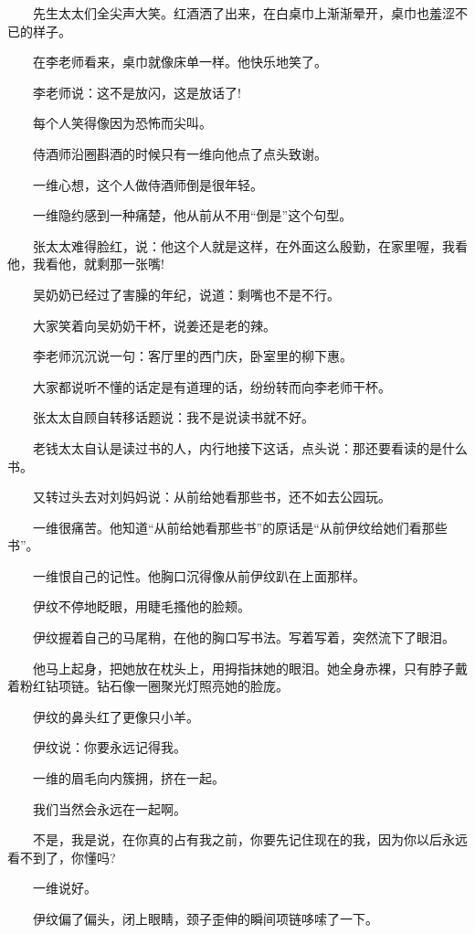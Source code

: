 \documentclass[12pt,UTF8]{ctexbook}
\begin{document}
　　先生太太们全尖声大笑。红酒洒了出来，在白桌巾上渐渐晕开，桌巾也羞涩不已的样子。

　　在李老师看来，桌巾就像床单一样。他快乐地笑了。

　　李老师说：这不是放闪，这是放话了!

　　每个人笑得像因为恐怖而尖叫。

　　侍酒师沿圈斟酒的时候只有一维向他点了点头致谢。

　　一维心想，这个人做侍酒师倒是很年轻。

　　一维隐约感到一种痛楚，他从前从不用\enquote{倒是}这个句型。

　　张太太难得脸红，说：他这个人就是这样，在外面这么殷勤，在家里喔，我看他，我看他，就剩那一张嘴!

　　吴奶奶已经过了害臊的年纪，说道：剩嘴也不是不行。

　　大家笑着向吴奶奶干杯，说姜还是老的辣。

　　李老师沉沉说一句：客厅里的西门庆，卧室里的柳下惠。

　　大家都说听不懂的话定是有道理的话，纷纷转而向李老师干杯。

　　张太太自顾自转移话题说：我不是说读书就不好。

　　老钱太太自认是读过书的人，内行地接下这话，点头说：那还要看读的是什么书。

　　又转过头去对刘妈妈说：从前给她看那些书，还不如去公园玩。

　　一维很痛苦。他知道\enquote{从前给她看那些书}的原话是\enquote{从前伊纹给她们看那些书}。

　　一维恨自己的记性。他胸口沉得像从前伊纹趴在上面那样。

　　伊纹不停地眨眼，用睫毛搔他的脸颊。

　　伊纹握着自己的马尾稍，在他的胸口写书法。写着写着，突然流下了眼泪。

　　他马上起身，把她放在枕头上，用拇指抹她的眼泪。她全身赤裸，只有脖子戴着粉红钻项链。钻石像一圈聚光灯照亮她的脸庞。

　　伊纹的鼻头红了更像只小羊。

　　伊纹说：你要永远记得我。

　　一维的眉毛向内簇拥，挤在一起。

　　我们当然会永远在一起啊。

　　不是，我是说，在你真的占有我之前，你要先记住现在的我，因为你以后永远看不到了，你懂吗?

　　一维说好。

　　伊纹偏了偏头，闭上眼睛，颈子歪伸的瞬间项链哆嗦了一下。
\end{document}
